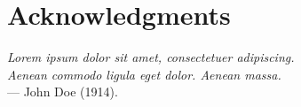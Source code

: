 

%
%


\chapter*{Acknowledgments}

\begin{flushright}
{\slshape Lorem ipsum dolor sit amet, consectetuer adipiscing.}\\
{\slshape Aenean commodo ligula eget dolor. Aenean massa.}\\%
\medskip
--- John Doe (1914).%
\end{flushright}

\bigskip

\lipsum[2-5]%

